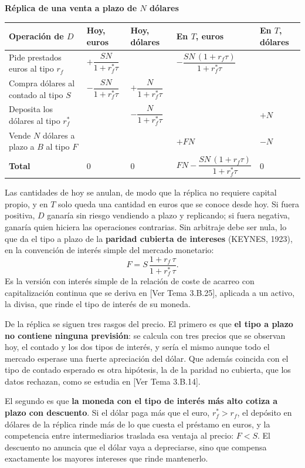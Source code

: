 \documentclass[10pt,a4paper]{article}
\newcommand{\authorfont}[1]{{\fontfamily{EBGaramond-TLF}\selectfont #1}}
\begin{document}
\begin{center}
{\small\textbf{Réplica de una venta a plazo de $N$ dólares}}\par\vspace{0.4em}
\small
\renewcommand{\arraystretch}{1.6}
\begin{tabular}{|p{4.0cm}|p{2.4cm}|p{2.2cm}|p{3.2cm}|p{1.7cm}|}
\hline
\textbf{Operación de $D$} & \textbf{Hoy, euros} & \textbf{Hoy, dólares} & \textbf{En $T$, euros} & \textbf{En $T$, dólares} \tabularnewline
\hline
Pide prestados euros al tipo $r_f$ & $+\dfrac{SN}{1+r_f^*\tau}$ & & $-\dfrac{SN\,(1+r_f\tau)}{1+r_f^*\tau}$ & \tabularnewline
\hline
Compra dólares al contado al tipo $S$ & $-\dfrac{SN}{1+r_f^*\tau}$ & $+\dfrac{N}{1+r_f^*\tau}$ & & \tabularnewline
\hline
Deposita los dólares al tipo $r_f^*$ & & $-\dfrac{N}{1+r_f^*\tau}$ & & $+N$ \tabularnewline
\hline
Vende $N$ dólares a plazo a $B$ al tipo $F$ & & & $+FN$ & $-N$ \tabularnewline
\hline
\textbf{Total} & $0$ & $0$ & $FN-\dfrac{SN\,(1+r_f\tau)}{1+r_f^*\tau}$ & $0$ \tabularnewline
\hline
\end{tabular}
\end{center}

Las cantidades de hoy se anulan, de modo que la réplica no requiere capital propio, y en $T$ solo queda una cantidad en euros que se conoce desde hoy. Si fuera positiva, $D$ ganaría sin riesgo vendiendo a plazo y replicando; si fuera negativa, ganaría quien hiciera las operaciones contrarias. Sin arbitraje debe ser nula, lo que da el tipo a plazo de la \textbf{paridad cubierta de intereses} (KEYNES, 1923), en la convención de interés simple del mercado monetario:
$$F=S\,\frac{1+r_f\,\tau}{1+r_f^*\,\tau}.$$
Es la versión con interés simple de la relación de coste de acarreo con capitalización continua que se deriva en [\authorfont{Ver Tema 3.B.25}], aplicada a un activo, la divisa, que rinde el tipo de interés de su moneda.

De la réplica se siguen tres rasgos del precio. El primero es que \textbf{el tipo a plazo no contiene ninguna previsión}: se calcula con tres precios que se observan hoy, el contado y los dos tipos de interés, y sería el mismo aunque todo el mercado esperase una fuerte apreciación del dólar. Que además coincida con el tipo de contado esperado es otra hipótesis, la de la paridad no cubierta, que los datos rechazan, como se estudia en [\authorfont{Ver Tema 3.B.14}].

El segundo es que \textbf{la moneda con el tipo de interés más alto cotiza a plazo con descuento}. Si el dólar paga más que el euro, $r_f^*>r_f$, el depósito en dólares de la réplica rinde más de lo que cuesta el préstamo en euros, y la competencia entre intermediarios traslada esa ventaja al precio: $F<S$. El descuento no anuncia que el dólar vaya a depreciarse, sino que compensa exactamente los mayores intereses que rinde mantenerlo.
\end{document}
